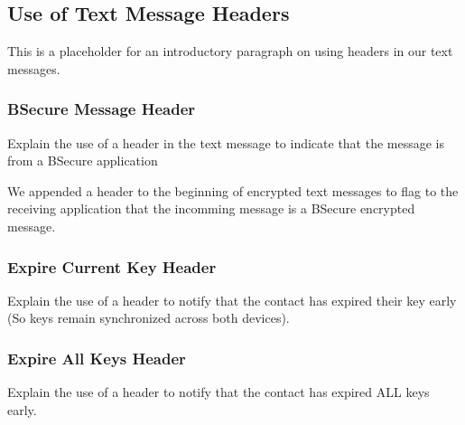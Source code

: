 \subsection{Use of Text Message Headers}
This is a placeholder for an introductory paragraph on using headers in our text messages.

\subsubsection{BSecure Message Header}
Explain the use of a header in the text message to indicate that the message is from a BSecure application

We appended a header to the beginning of encrypted text messages to flag to the receiving application that
the incomming message is a BSecure encrypted message.

\subsubsection{Expire Current Key Header}
Explain the use of a header to notify that the contact has expired their key early (So keys remain synchronized across both devices).

\subsubsection{Expire All Keys Header}
Explain the use of a header to notify that the contact has expired ALL keys early.


